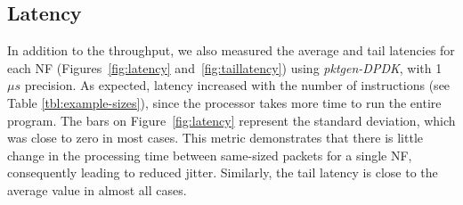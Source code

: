 
\subsection{Latency}

In addition to the throughput, we also measured the average and tail latencies for each NF (Figures~\ref{fig:latency} and~\ref{fig:taillatency}) using \textit{pktgen-DPDK}, with 1 $\mu s$ precision.
As expected, latency increased with the number of instructions (see Table \ref{tbl:example-sizes}), since the processor takes more time to run the entire program. The bars on Figure~\ref{fig:latency} represent the standard deviation, which was close to zero in most cases. This metric demonstrates that there is little change in the processing time between same-sized packets for a single NF, consequently leading to reduced jitter. Similarly, the tail latency is close to the average value in almost all cases.


